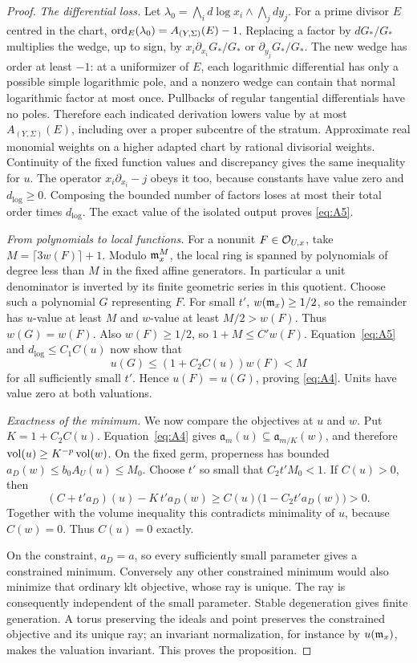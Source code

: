 \begin{proof}
\smallskip
\noindent\emph{The differential loss.}
Let
\(\lambda_0=\bigwedge_i d\log x_i\wedge\bigwedge_jdy_j\).
For a prime divisor \(E\) centred in the chart,
\(\operatorname{ord}_E(\lambda_0)=A_{(Y,\Sigma)}(E)-1\).
Replacing a factor by \(dG_*/G_*\) multiplies the wedge, up to sign,
by \(x_i\partial_{x_i}G_*/G_*\) or
\(\partial_{y_j}G_*/G_*\). The new wedge has order at least \(-1\):
at a uniformizer of \(E\), each logarithmic differential has only a
possible simple logarithmic pole, and a nonzero wedge can contain that
normal logarithmic factor at most once. Pullbacks of regular tangential
differentials have no poles. Therefore each indicated derivation lowers
value by at most \(A_{(Y,\Sigma)}(E)\), including over a proper
subcentre of the stratum. Approximate real monomial weights on a higher
adapted chart by rational divisorial weights. Continuity of the fixed
function values and discrepancy gives the same inequality for \(u\).
The operator \(x_i\partial_{x_i}-j\) obeys it too, because constants
have value zero and \(d_{\log}\geq0\). Composing the bounded number of
factors loses at most their total order times \(d_{\log}\).
The exact value of the isolated output proves \eqref{eq:A5}.

\smallskip
\noindent\emph{From polynomials to local functions.}
For a nonunit \(F\in\mathcal O_{U,x}\), take
\(M=\lceil3w(F)\rceil+1\).
Modulo \(\mathfrak m_x^M\), the local ring is spanned by polynomials of degree
less than \(M\) in the fixed affine generators. In particular a unit
denominator is inverted by its finite geometric series in this quotient.
Choose such a polynomial \(G\) representing \(F\).
For small \(t'\), \(w(\mathfrak m_x)\geq1/2\), so the remainder has
\(u\)-value at least \(M\) and \(w\)-value at least \(M/2>w(F)\).
Thus \(w(G)=w(F)\). Also \(w(F)\geq1/2\), so \(1+M\leq C'w(F)\).
Equation~\eqref{eq:A5} and \(d_{\log}\leq C_1C(u)\) now show that
\[
            u(G)\leq(1+C_2C(u))w(F)<M
\]
for all sufficiently small \(t'\). Hence \(u(F)=u(G)\), proving
\eqref{eq:A4}. Units have value zero at both valuations.

\smallskip
\noindent\emph{Exactness of the minimum.}
We now compare the objectives at \(u\) and \(w\).
Put \(K=1+C_2C(u)\). Equation~\eqref{eq:A4} gives
\(\mathfrak a_m(u)\subseteq\mathfrak a_{m/K}(w)\), and therefore
\(\operatorname{vol}(u)\geq K^{-p}\operatorname{vol}(w)\).
On the fixed germ, properness has bounded
\(a_D(w)\leq b_0A_U(u)\leq M_0\).
Choose \(t'\) so small that \(C_2t'M_0<1\).
If \(C(u)>0\), then
\[
 (C+t'a_D)(u)-K\,t'a_D(w)
     \geq C(u)\bigl(1-C_2t'a_D(w)\bigr)>0.
\]
Together with the volume inequality this contradicts minimality of
\(u\), because \(C(w)=0\). Thus \(C(u)=0\) exactly.

On the constraint, \(a_D=a\), so every sufficiently small parameter
gives a constrained minimum. Conversely any other constrained minimum
would also minimize that ordinary klt objective, whose ray is unique.
The ray is consequently independent of the small parameter.
Stable degeneration gives finite generation. A torus preserving the
ideals and point preserves the constrained objective and its unique ray;
an invariant normalization, for instance by \(u(\mathfrak m_x)\), makes the
valuation invariant. This proves the proposition.
\end{proof}
